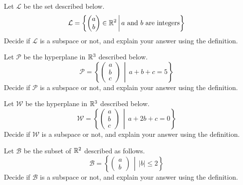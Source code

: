 \documentclass[elementsmain.tex]{subfiles}
\begin{document}
\begin{exercise} 
Let $\mathcal{L}$ be the set described below. 
\begin{equation*}
\mathcal{L} = \left\{ \begin{pmatrix} a \\ b \end{pmatrix}\in \mathbb{R}^2  \,\middle|\, \text{$a$ and $b$ are integers} \right\}
\end{equation*}
Decide if $\mathcal{L}$ is a subspace or not, and explain your answer using the definition.
\end{exercise}

\begin{exercise}
Let $\mathcal{P}$ be the hyperplane in $\mathbb{R}^3$ described below.
\begin{equation*}
\mathcal{P} = \left\{ \begin{pmatrix} a\\ b \\ c \end{pmatrix} \,\middle|\, a+b+c=5 \right\}
\end{equation*}
Decide if $\mathcal{P}$ is a subspace or not, and explain your answer using the definition.
\end{exercise}

\begin{exercise}
Let $\mathcal{W}$ be the hyperplane in $\mathbb{R}^3$ described below.
\begin{equation*}
\mathcal{W} = \left\{ \begin{pmatrix} a\\ b \\ c \end{pmatrix} \,\middle|\, a+2b+c=0 \right\}
\end{equation*}
Decide if $\mathcal{W}$ is a subspace or not, and explain your answer using the definition.
\end{exercise}


\begin{exercise} Let $\mathcal{B}$ be the subset of $\mathbb{R}^2$ described as follows.
\begin{equation*}
\mathcal{B} = \left\{ \begin{pmatrix} a\\ b \end{pmatrix} \,\middle|\, |b|\leq 2 \right\}
\end{equation*}
Decide if $\mathcal{B}$ is a subspace or not, and explain your answer using the definition.
\end{exercise}





\clearpage
\end{document}
